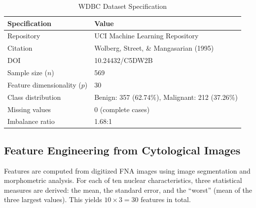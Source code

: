 \documentclass[10pt,letterpaper]{article}
\begin{document}
\begin{table}[h]
\centering
\caption{WDBC Dataset Specification}
\label{tab:dataset}
\begin{tabular}{ll}
\toprule
\textbf{Specification} & \textbf{Value} \\
\midrule
Repository & UCI Machine Learning Repository \\
Citation & Wolberg, Street, \& Mangasarian (1995) \\
DOI & 10.24432/C5DW2B \\
Sample size ($n$) & 569 \\
Feature dimensionality ($p$) & 30 \\
Class distribution & Benign: 357 (62.74\%), Malignant: 212 (37.26\%) \\
Missing values & 0 (complete cases) \\
Imbalance ratio & 1.68:1 \\
\bottomrule
\end{tabular}
\end{table}

\subsection{Feature Engineering from Cytological Images}

Features are computed from digitized FNA images using image segmentation and morphometric analysis.
For each of ten nuclear characteristics, three statistical measures are derived: the mean, the
standard error, and the ``worst'' (mean of the three largest values). This yields $10 \times 3 = 30$
features in total.
\end{document}

